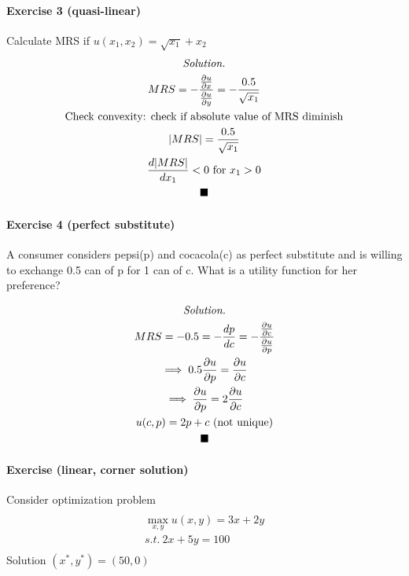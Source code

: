 \documentclass{article}
\newcommand{\tx}[1]{\text{{#1}}}
\newcommand{\pd}[2]{\frac{\partial {#1}}{\partial {#2}}}
\begin{document}
\paragraph{Exercise 3 (quasi-linear)} Calculate MRS if $u(x_1, x_2) = \sqrt{x_1} + x_2$
\begin{multline*}
	\emph{Solution.} \\
	MRS = - \frac{\pd{u}{x}}{\pd{u}{y}} = -\frac{0.5}{\sqrt{x_1}} \\
	\tx{Check convexity: check if absolute value of MRS diminish} \\
	\vert MRS \vert = \frac{0.5}{\sqrt{x_1}} \\
	\frac{d \vert MRS \vert}{d x_1} < 0 \tx{ for } x_1 > 0 \\
	\blacksquare
\end{multline*}

\paragraph{Exercise 4 (perfect substitute)} A consumer considers pepsi(p) and cocacola(c) as perfect substitute and is willing to exchange 0.5 can of p for 1 can of c. What is a utility function for her preference?

\begin{multline*}
	\emph{Solution.} \\
	MRS = -0.5 = - \frac{dp}{dc} = - \frac{\pd{u}{c}}{\pd{u}{p}}\\
	\implies 0.5 \pd{u}{p} = \pd{u}{c} \\
	\implies \pd{u}{p} = 2 \pd{u}{c} \\
	u(c, p) = 2 p + c \tx{ (not unique)}\\
	\blacksquare
\end{multline*}

\paragraph{Exercise (linear, corner solution)} Consider optimization problem 
\begin{multline*}
	\\
	\max_{x,y} u(x,y) = 3x+2y \\
	s.t.\ 2x + 5y = 100 \\
\end{multline*}
Solution $(x^*, y^*) = (50, 0)$
\end{document}
